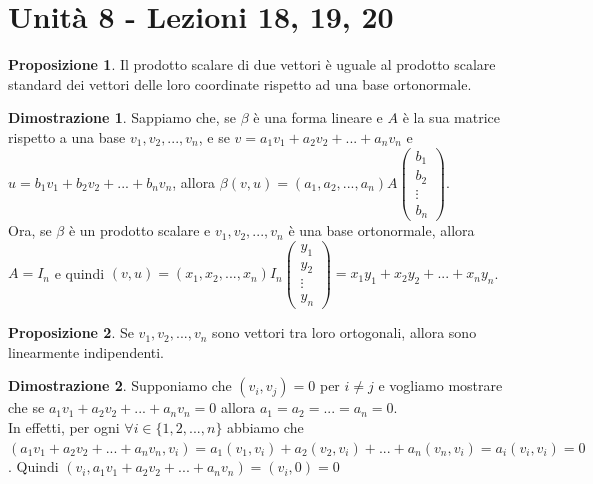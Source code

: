\documentclass[a4paper]{article}
\theoremstyle{definition}
\newtheorem*{dimm}{Dimostrazione}
\newtheorem*{prop}{Proposizione}
\begin{document}
	\section{Unità 8  - Lezioni 18, 19, 20}

	\begin{prop}
		Il prodotto scalare di due vettori è uguale al prodotto scalare standard dei vettori delle loro coordinate rispetto ad una base ortonormale.
	\end{prop}
	\begin{dimm}
		Sappiamo che, se $\beta$ è una forma lineare e $A$ è la sua matrice rispetto a una base $v_1, v_2, ..., v_n$, e se
		$v = a_1v_1 + a_2v_2 + ... + a_nv_n$ e $u = b_1v_1 + b_2v_2 + ... + b_nv_n$, allora $\beta(v, u) = (a_1, a_2, ..., a_n)A \begin{pmatrix}
			b_1 \\
			b_2 \\
			\vdots \\
			b_n
		\end{pmatrix}$. \\
		Ora, se $\beta$ è un prodotto scalare e $v_1, v_2, ..., v_n$ è una base ortonormale, allora $A = I_n$ e quindi $(v, u) = (x_1, x_2, ..., x_n)I_n \begin{pmatrix}
			y_1 \\
			y_2 \\
			\vdots \\
			y_n
		\end{pmatrix} = x_1y_1 + x_2y_2 + ... + x_ny_n$.
	\end{dimm}

	\begin{prop}
		Se $v_1, v_2, ..., v_n$ sono vettori tra loro ortogonali, allora sono linearmente indipendenti.
	\end{prop}
	\begin{dimm}
		Supponiamo che $(v_i, v_j) = 0$ per $i \ne j$ e vogliamo mostrare che se $a_1v_1 + a_2v_2 + ... + a_nv_n = 0$ allora $a_1 = a_2 = ... = a_n = 0$. \\
		In effetti, per ogni $\forall i \in \{1, 2, ..., n\}$ abbiamo che $(a_1v_1 + a_2v_2 + ... + a_nv_n, v_i) = a_1(v_1, v_i) + a_2(v_2, v_i) + ... + a_n(v_n, v_i) = a_i(v_i, v_i) = 0$.
		Quindi $(v_i, a_1v_1 + a_2v_2 + ... + a_nv_n) = (v_i, 0) = 0$
	\end{dimm}
\end{document}
